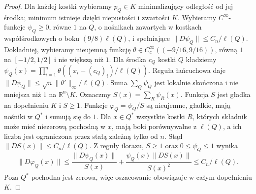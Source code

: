 \begin{proof}
Dla każdej kostki wybieramy $p_Q\in K$ minimalizujący
odległość od jej środka; minimum istnieje dzięki
niepustości i zwartości $K$. Wybieramy $C^\infty$-funkcje
$\psi_Q\ge0$, równe $1$ na $Q$, o nośnikach zawartych
w kostkach współśrodkowych o boku $(9/8)\ell(Q)$,
i spełniające $\|D\psi_Q\|\le C_n/\ell(Q)$.
Dokładniej, wybieramy nieujemną funkcję
$\theta\in C_c^\infty((-9/16,9/16))$, równą $1$
na $[-1/2,1/2]$ i nie większą niż $1$.
Dla środka $c_Q$ kostki $Q$ kładziemy
$\psi_Q(x)=\prod_{i=1}^n\theta((x_i-(c_Q)_i)/\ell(Q))$.
Reguła łańcuchowa daje
$\|D\psi_Q\|\le\sqrt n\|\theta'\|_\infty/\ell(Q)$.
Suma $\sum_Q\psi_Q$ jest lokalnie skończona i nie
mniejsza niż $1$ na $\mathbb R^n\setminus K$.
Oznaczmy $S(x)=\sum_R\psi_R(x)$. Funkcja $S$
jest gładka na dopełnieniu $K$ i $S\ge1$.
Funkcje $\varphi_Q=\psi_Q/S$ są nieujemne, gładkie,
mają nośniki w $Q^*$ i sumują się do $1$.
Dla $x\in Q^*$ wszystkie kostki $R$, których składnik
może mieć niezerową pochodną w $x$, mają boki
porównywalne z $\ell(Q)$, a ich liczba jest ograniczona
przez stałą zależną tylko od $n$. Stąd
$\|DS(x)\|\le C_n/\ell(Q)$. Z reguły ilorazu,
$S\ge1$ oraz $0\le\psi_Q\le1$ wynika
\[
 \|D\varphi_Q(x)\|
 \le\frac{\|D\psi_Q(x)\|}{S(x)}
 +\frac{\psi_Q(x)\|DS(x)\|}{S(x)^2}
 \le C_n/\ell(Q).
\]
Poza $Q^*$ pochodna jest zerowa, więc oszacowanie
obowiązuje w całym dopełnieniu $K$.


\end{proof}

